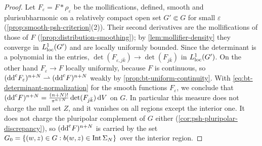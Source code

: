 \begin{proof}
Let $F_\varepsilon=F*\rho_\varepsilon$ be the mollifications, defined, smooth and plurisubharmonic on a relatively compact open set $G'\Subset G$ for small $\varepsilon$ (\cref{prop:smooth-psh-criterion}(2)). Their second derivatives are the mollifications of those of $F$ (\cref{prop:distribution-smoothing}); by \cref{lem:mollifier-density} they converge in $L^1_{\mathrm{loc}}(G')$ and are locally uniformly bounded. Since the determinant is a polynomial in the entries, $\det(F_{\varepsilon,j\bar k})\to\det(F_{j\bar k})$ in $L^1_{\mathrm{loc}}(G')$. On the other hand $F_\varepsilon\to F$ locally uniformly, because $F$ is continuous, so $(\mathrm{dd}^{\mathrm{c}} F_\varepsilon)^{n+N}\rightharpoonup(\mathrm{dd}^{\mathrm{c}} F)^{n+N}$ weakly by \cref{prop:bt-uniform-continuity}. With \eqref{eq:bt-determinant-normalization} for the smooth functions $F_\varepsilon$, we conclude that $(\mathrm{dd}^{\mathrm{c}} F)^{n+N}=\frac{(n+N)!}{\pi^{n+N}}\det(F_{j\bar k})\,\mathrm dV$ on $G$. In particular this measure does not charge the null set $Z$, and it vanishes on all regions except the interior one. It does not charge the pluripolar complement of $G$ either (\cref{cor:psh-pluripolar-discrepancy}), so $(\mathrm{dd}^{\mathrm{c}} F)^{n+N}$ is carried by the set $G_0=\{(w,z)\in G:b(w,z)\in\operatorname{Int}\Sigma_N\}$ over the interior region.


\end{proof}
